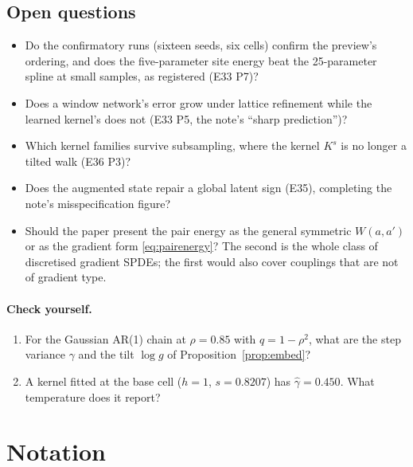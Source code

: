 \subsection{Open questions}

\begin{itemize}
\item Do the confirmatory runs (sixteen seeds, six cells) confirm the preview's ordering, and does the
  five-parameter site energy beat the 25-parameter spline at small samples, as registered (E33 P7)?
\item Does a window network's error grow under lattice refinement while the learned kernel's does not (E33 P5,
  the note's ``sharp prediction'')?
\item Which kernel families survive subsampling, where the kernel $K^s$ is no longer a tilted walk (E36 P3)?
\item Does the augmented state repair a global latent sign (E35), completing the note's misspecification figure?
\item Should the paper present the pair energy as the general symmetric $W(a,a')$ or as the gradient form
  \eqref{eq:pairenergy}? The second is the whole class of discretised gradient SPDEs; the first would also cover
  couplings that are not of gradient type.
\end{itemize}

\paragraph{Check yourself.}
\begin{enumerate}[label=\thesection.\arabic*,leftmargin=2.2em]
\item For the Gaussian AR(1) chain at $\rho=0.85$ with $q=1-\rho^2$, what are the step variance $\gamma$ and the tilt
  $\log g$ of Proposition~\ref{prop:embed}?
\item A kernel fitted at the base cell ($h=1$, $s=0.8207$) has $\hat\gamma=0.450$. What temperature does it report?
\end{enumerate}

\appendix
\section{Notation}

